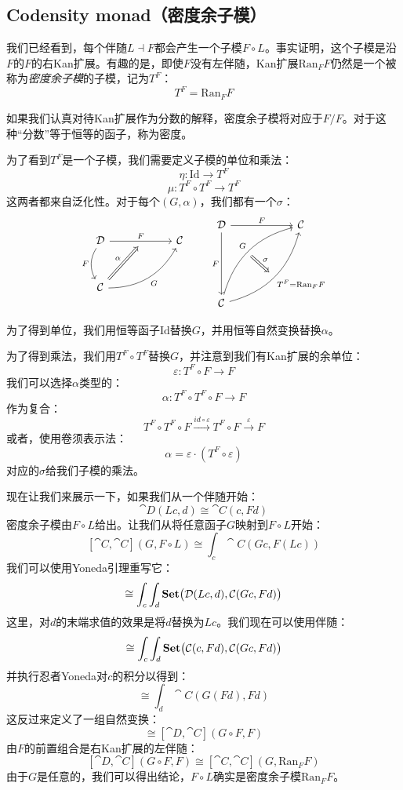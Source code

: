 \documentclass[DaoFP]{subfiles}
\begin{document}
\subsection{Codensity monad（密度余子模）}

我们已经看到，每个伴随$L \dashv F$都会产生一个子模$F \circ L$。事实证明，这个子模是沿$F$的$F$的右Kan扩展。有趣的是，即使$F$没有左伴随，Kan扩展$\text{Ran}_F F$仍然是一个被称为\emph{密度余子模}的子模，记为$T^F$：
\[ T^F = \text{Ran}_F F \]

如果我们认真对待Kan扩展作为分数的解释，密度余子模将对应于$F/F$。对于这种“分数”等于恒等的函子，称为密度。

为了看到$T^F$是一个子模，我们需要定义子模的单位和乘法：
\[ \eta \colon \text{Id} \to T^F \]
\[ \mu \colon T^F \circ T^F \to  T^F \]
这两者都来自泛化性。对于每个$(G, \alpha)$，我们都有一个$\sigma$：
\[
\begin{tikzcd} [row sep=1cm, column sep=1cm]
\cat D
\arrow[rr, "F", "" {name=ID, below} ]
\arrow[d, bend right, "F"']
&& \cat C
\\
\cat C
\arrow[urr, bend right, "G"']
\arrow[Rightarrow, "\alpha",  to=ID]
\end{tikzcd}
\qquad
\begin{tikzcd}[row sep=2cm, column sep=2cm]
\cat D  \ar[d, "F"', "" {name=P}]
\ar[r, "F", ""  {name=F, below, near start, bend right}]
&
\cat C
\\
\cat C
\ar[ur, bend left, "G", "" {name=G, below}]
\ar[ur, bend right, "T^F = \text{Ran}_F F"', "" {name=Ran}]
\arrow[Rightarrow, "\sigma", from=G, to=Ran]
\end{tikzcd}
\]

为了得到单位，我们用恒等函子$\text{Id}$替换$G$，并用恒等自然变换替换$\alpha$。

为了得到乘法，我们用$T^F \circ T^F$替换$G$，并注意到我们有Kan扩展的余单位：
\[ \varepsilon \colon  T^F \circ F \to F \]
我们可以选择$\alpha$类型的：
\[ \alpha \colon T^F \circ T^F \circ F \to F \]
作为复合：
\[ T^F \circ T^F \circ F \xrightarrow{id \circ \varepsilon} T^F \circ F \xrightarrow{\varepsilon} F\]
或者，使用卷须表示法：
\[ \alpha = \varepsilon \cdot (T^F \circ \varepsilon) \]
对应的$\sigma$给我们子模的乘法。

现在让我们来展示一下，如果我们从一个伴随开始：
\[ \cat D(L c, d) \cong \cat C (c, F d) \]
密度余子模由$F \circ L$给出。让我们从将任意函子$G$映射到$F \circ L$开始：
\[ [\cat C, \cat C](G, F \circ L) \cong  \int_c \cat C (G c, F (L c)) \]
我们可以使用Yoneda引理重写它：
\[ \cong \int_c \int_d \mathbf{Set}\big(\mathcal{D}(L c, d), \mathcal{C} (G c, F d)\big) \]
这里，对$d$的末端求值的效果是将$d$替换为$L c$。我们现在可以使用伴随：
\[ \cong \int_c \int_d \mathbf{Set}\big(\mathcal{C}(c, F d), \mathcal{C} (G c, F d)\big) \]
并执行忍者Yoneda对$c$的积分以得到：
\[ \cong \int_d \cat C (G (F d), F d) \]
这反过来定义了一组自然变换：
\[ \cong [\cat D, \cat C](G \circ F, F) \]
由$F$的前置组合是右Kan扩展的左伴随：
\[ [\cat D, \cat C](G \circ F, F) \cong  [\cat C, \cat C] (G, \text{Ran}_F F)\]
由于$G$是任意的，我们可以得出结论，$F \circ L$确实是密度余子模$\text{Ran}_F F$。
\end{document}
